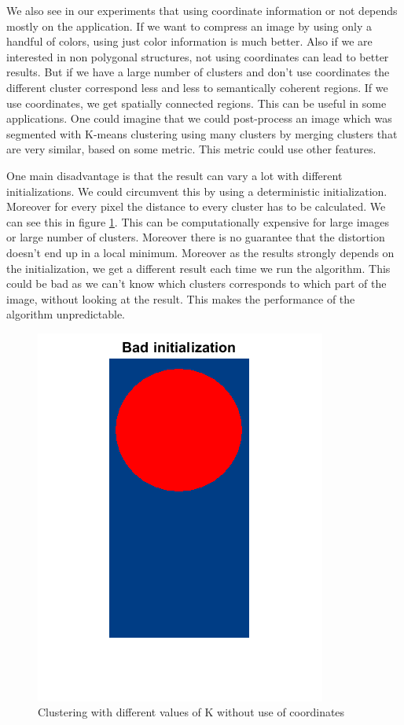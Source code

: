 We also see in our experiments that using coordinate information or not depends mostly on the application. If we want to compress an image by using only a handful of colors, using just color information is much better. Also if we are interested in non polygonal structures, not using coordinates can lead to better results. But if we have a large number of clusters and don't use coordinates the different cluster correspond less and less to semantically coherent regions. If we use coordinates, we get spatially connected regions. This can be useful in some applications. One could imagine that we could post-process an image which was segmented with K-means clustering using many clusters by merging clusters that are very similar, based on some metric. This metric could use other features.

One main disadvantage is that the result can vary a lot with different initializations. We could circumvent this by using a deterministic initialization. Moreover for every pixel the distance to every cluster has to be calculated. We can see this in figure \ref{fig:simple:badinit}. This can be computationally expensive for large images or large number of clusters. Moreover there is no guarantee that the distortion doesn't end up in a local minimum. Moreover as the results strongly depends on the initialization, we get a different result each time we run the algorithm. This could be bad as we can't know which clusters corresponds to which part of the image, without looking at the result. This makes the performance of the algorithm unpredictable.

\begin{figure}[h!]
\centering
\includegraphics[width =0.5\linewidth]{figures/task2/bad_initialization.png}
\caption{Clustering with different values of K without use of coordinates}
\label{fig:simple:badinit}
\end{figure}